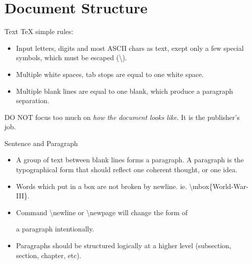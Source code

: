 \documentclass[10pt]{beamer}
\begin{document}
\section{Document Structure}
\begin{frame}[t]{Text}
    \TeX{} simple rules:
\begin{itemize}
    \item Input letters, digits and most ASCII chars as text, exept only
        a few special symbols, which must be escaped
        (\alert{\textbackslash}).
    \item Multiple white spaces, tab stops are equal to one white space.
    \item Multiple blank lines are equal to one blank, which produce
        a paragraph separation.
\end{itemize}

    \alert{DO NOT} focus too much on {\em how the document looks like}.
    It is the publisher's job.

\end{frame}

\begin{frame}[t]{Sentence and Paragraph}
\begin{itemize}
    \item A group of text between blank lines forms a paragraph.
        A paragraph is the typographical form that should reflect
        one \alert{coherent} thought, or one idea.
    \item Words which put in a box are not broken by newline. ie.
        \textbackslash mbox\{World-War-III\}.
    \item Command \alert{\textbackslash newline} or
        \alert{\textbackslash newpage} will change the form of

        a paragraph intentionally.
    \item Paragraphs should be structured logically at a higher level
        (\alert{subsection}, \alert{section}, \alert{chapter}, etc).
\end{itemize}
\end{frame}
\end{document}
